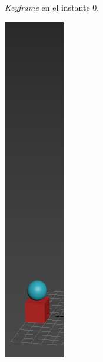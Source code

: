 \documentclass{article}
\begin{document}
\begin{figure}[H]
\begin{subfigure}[H]{0.15\textwidth}
	    \caption{\textit{Keyframe} en el instante 0.}
	\end{subfigure}   
    \hfill
	\begin{subfigure}[H]{0.15\textwidth}
	    \centering
	    \includegraphics[width=\textwidth]{imagenes/Ejercicio 1/p1_ins15.png}

\end{subfigure}
\end{figure}
\end{document}
